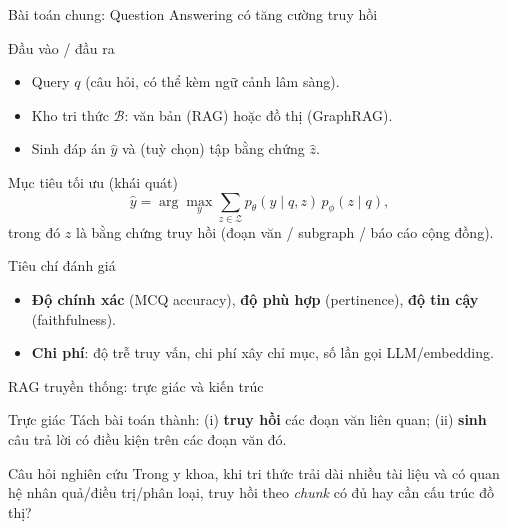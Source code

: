 \documentclass[aspectratio=169,10pt]{beamer}
\newcommand{\B}{\mathcal{B}}
\begin{document}
\begin{frame}{Bài toán chung: Question Answering có tăng cường truy hồi}
\small
\begin{block}{Đầu vào / đầu ra}
\begin{itemize}
  \item Query \(q\) (câu hỏi, có thể kèm ngữ cảnh lâm sàng).
  \item Kho tri thức \(\B\): văn bản (RAG) hoặc đồ thị (GraphRAG).
  \item Sinh đáp án \(\hat{y}\) và (tuỳ chọn) tập bằng chứng \(\hat{z}\).
\end{itemize}
\end{block}

\begin{block}{Mục tiêu tối ưu (khái quát)}
\[
\hat{y} = \arg\max_y \sum_{z \in \mathcal{Z}} p_\theta(y \mid q, z)\, p_\phi(z \mid q),
\]
trong đó \(z\) là bằng chứng truy hồi (đoạn văn / subgraph / báo cáo cộng đồng).
\end{block}

\begin{block}{Tiêu chí đánh giá}
\begin{itemize}
  \item \textbf{Độ chính xác} (MCQ accuracy), \textbf{độ phù hợp} (pertinence), \textbf{độ tin cậy} (faithfulness).
  \item \textbf{Chi phí}: độ trễ truy vấn, chi phí xây chỉ mục, số lần gọi LLM/embedding.
\end{itemize}
\end{block}
\end{frame}

\begin{frame}{RAG truyền thống: trực giác và kiến trúc}
\small
\begin{block}{Trực giác}
Tách bài toán thành: (i) \textbf{truy hồi} các đoạn văn liên quan; (ii) \textbf{sinh} câu trả lời có điều kiện trên các đoạn văn đó.
\end{block}

\begin{center}
\end{center}

\begin{block}{Câu hỏi nghiên cứu}
Trong y khoa, khi tri thức trải dài nhiều tài liệu và có quan hệ nhân quả/điều trị/phân loại, truy hồi theo \textit{chunk} có đủ hay cần cấu trúc đồ thị?
\end{block}
\end{frame}
\end{document}

